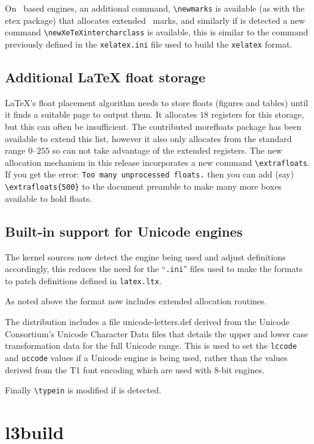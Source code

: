 \documentclass{ltnews}
\begin{document}
On \eTeX\ based engines, an additional command, \verb|\newmarks| is available
(as with the \textsf{etex} package) that allocates extended \eTeX\ marks, and
similarly if  is detected a new command
\verb|\newXeTeXintercharclass| is available, this is similar to the command
previously defined in the \texttt{xelatex.ini} file used to build the
\texttt{xelatex} format.

\subsection{Additional \LaTeX{} float storage}

\LaTeX's float placement algorithm needs to store floats (figures and tables)
until it finds a suitable page to output them. It allocates $18$ registers for
this storage, but this can often be insufficient.
 The contributed \textsf{morefloats} package has
been available to extend this list, however it also only allocates from the
standard range $0$--$255$ so can not take advantage of the extended registers.
The new allocation mechanism in this release incorporates a new command
\verb|\extrafloats|. If you get the error:
\mbox{\texttt{Too many unprocessed floats.}}
then you can add (say) \verb|\extrafloats{500}| to the document preamble to
make many more boxes available to hold floats. 


\subsection{Built-in support for Unicode engines}

The kernel sources now detect the engine being used and adjust definitions
accordingly, this reduces the need for the ``\texttt{.ini}'' files used to make
the formats to patch definitions defined in \texttt{latex.ltx}.
 
As noted above the format now includes extended allocation routines.

The distribution includes a file \textsf{unicode-letters.def} derived from the
Unicode Consortium's Unicode Character Data files that details the upper and
lower case transformation data for the full Unicode range. This is used to set
the \verb|lccode| and \verb|uccode| values if a Unicode engine is being used,
rather than the values derived from the T1 font encoding which are used with
8-bit engines.

Finally \verb|\typein| is modified if  is detected.

\section{l3build}
\end{document}
